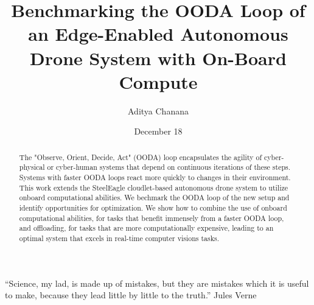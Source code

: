 \documentclass[12pt]{cmuthesis}
\begin{document}
\frontmatter

\pagestyle{empty}

\title{ %
{\bf Benchmarking the OODA Loop of an Edge-Enabled Autonomous Drone System with On-Board Compute}}
\author{Aditya Chanana}
\date{December 18}
\trnumber{}


\support{}
\disclaimer{}



\maketitle

\begin{dedication}
“Science, my lad, is made up of mistakes, but they are mistakes which it is useful to make, because they lead little by little to the truth.” Jules Verne
\end{dedication}

\pagestyle{plain} %


\begin{abstract}

    The "Observe, Orient, Decide, Act" (OODA) loop encapsulates the agility of
    cyber-physical or cyber-human systems that depend on continuous iterations
    of these steps. Systems with faster OODA loops react more quickly to
    changes in their environment. This work extends the SteelEagle
    cloudlet-based autonomous drone system to utilize onboard computational
    abilities. We bechmark the OODA loop of the new setup and identify
    opportunities for optimization. We show how to combine the use of onboard
    computational abilities, for tasks that benefit immensely from a faster OODA loop,
    and offloading, for tasks that are more computationally expensive, leading
    to an optimal system that excels in real-time computer visions tasks.

\end{abstract}
\end{document}
